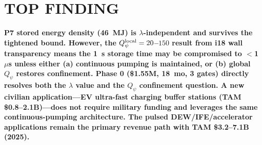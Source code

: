 \documentclass[11pt]{article}
\begin{document}
\section*{TOP FINDING}

\begin{tcolorbox}[colback=blue!5!white, colframe=blue!70!black]
\textbf{P7 stored energy density (46~MJ) is $\lambda$-independent and
survives the tightened bound. However, the $Q_\psi^{\rm local} = 20$--$150$
result from i18 wall transparency means the 1~s storage time may be
compromised to $<$1~$\mu$s unless either (a) continuous pumping is
maintained, or (b) global $Q_\psi$ restores confinement. Phase 0
(\$1.55M, 18~mo, 3 gates) directly resolves both the $\lambda$ value
and the $Q_\psi$ confinement question. A new civilian application---EV
ultra-fast charging buffer stations (TAM \$0.8--2.1B)---does not
require military funding and leverages the same continuous-pumping
architecture. The pulsed DEW/IFE/accelerator applications remain
the primary revenue path with TAM \$3.2--7.1B (2025).}
\end{tcolorbox}
\end{document}
